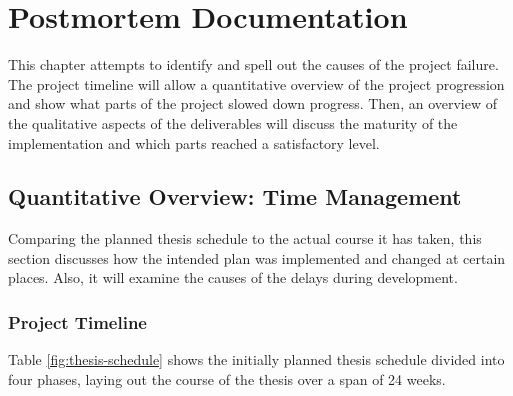 \chapter{Postmortem Documentation}
\label{chap:postmortem}
This chapter attempts to identify and spell out the causes of the project failure. The project timeline will allow a quantitative overview of the project progression and show what parts of the project slowed down progress. Then, an overview of the qualitative aspects of the deliverables will discuss the maturity of the implementation and which parts reached a satisfactory level.

\section{Quantitative Overview: Time Management}
\label{sec:pm-time-management}
Comparing the planned thesis schedule to the actual course it has taken, this section discusses how the intended plan was implemented and changed at certain places. Also, it will examine the causes of the delays during development.
\subsection{Project Timeline}
\label{sec:project-timeline}
Table \ref{fig:thesis-schedule} shows the initially planned thesis schedule divided into four phases, laying out the course of the thesis over a span of 24 weeks.

